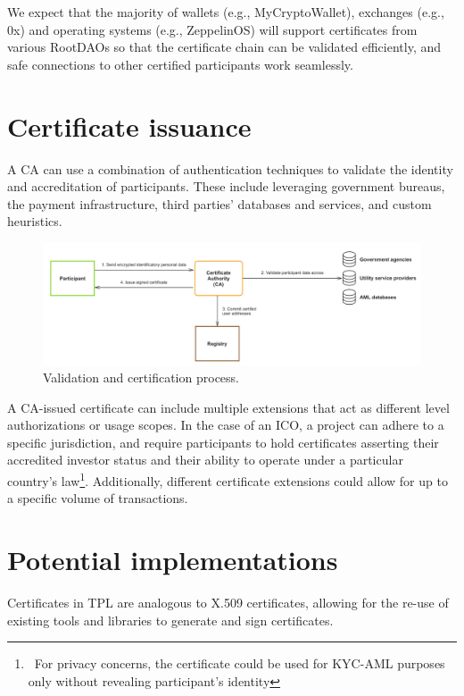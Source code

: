 \documentclass[10pt]{article}
\begin{document}
\noindent We expect that the majority of wallets (e.g., MyCryptoWallet), exchanges (e.g., 0x) and operating systems (e.g., ZeppelinOS) will support certificates from various RootDAOs so that the certificate chain can be validated efficiently, and safe connections to other certified participants work seamlessly.\\

\section{Certificate issuance}
A CA can use a combination of authentication techniques to validate the identity and accreditation of participants. These include leveraging government bureaus, the payment infrastructure, third parties' databases and services, and custom heuristics. \\

\begin{figure}[ht]
    \centering
    \includegraphics[width=0.8\linewidth]{figures/figure2.png}
    \caption{Validation and certification process.}
    \label{fig:fig2}
\end{figure}

\noindent A CA-issued certificate can include multiple extensions that act as different level authorizations or usage scopes. In the case of an ICO, a project can adhere to a specific jurisdiction, and require participants to hold certificates asserting their accredited investor status and their ability to operate under a particular country’s law\footnote{\ For privacy concerns, the certificate could be used for KYC-AML purposes only without revealing participant’s identity}. Additionally, different certificate extensions could allow for up to a specific volume of transactions.\\

\section{Potential implementations}
Certificates in TPL are analogous to X.509 certificates\cite{x509}, allowing for the re-use of existing tools and libraries to generate and sign certificates.\\
\end{document}
